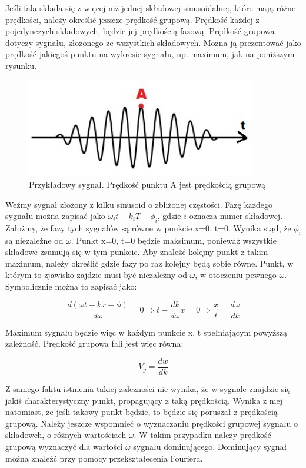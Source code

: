 Jeśli fala składa się z więcej niż jednej składowej sinusoidalnej, które mają różne prędkości, należy określić jeszcze prędkość grupową.  Prędkość każdej z pojedynczych składowych, będzie jej prędkością fazową. Prędkość grupowa dotyczy sygnału, złożonego ze wszystkich składowych. Można ją prezentować jako prędkość jakiegoś punktu na wykresie sygnału, np. maximum, jak na poniższym rysunku.

\begin{figure}[h]
\centering
\includegraphics[width=10cm]{Zdjecia/2/predkosc_grupowa_wierzcholek}
\caption{Przykładowy sygnał. Prędkość punktu A jest prędkością grupową}
\label{fig:przykladowy_sygnal}
\end{figure}

Weźmy sygnał złożony z kilku sinusoid o zbliżonej częstości. Fazę każdego sygnału można zapisać jako \( \omega_i t - k_i T + \phi_i \), gdzie \( i\) oznacza numer składowej. Założmy, że fazy tych sygnałów są równe w punkcie x=0, t=0. Wynika stąd, że \( \phi_i \) są niezależne od \( \omega \). Punkt x=0, t=0 będzie maksimum, ponieważ wszystkie składowe zsumują się w tym punkcie. Aby znaleźć kolejny punkt z takim maximum, należy określić gdzie fazy po raz kolejny będą sobie równe.  Punkt, w którym to zjawisko zajdzie musi być niezależny od \( \omega \), w otoczeniu pewnego \( \omega \). Symbolicznie można to zapisać jako:

\begin{equation}
\frac{d(\omega t - kx - \phi)}{d\omega}=0 \Rightarrow t-\frac{dk}{d\omega}x=0 \Rightarrow \frac{x}{t}=\frac{d\omega}{dk}
\end{equation}

Maximum sygnału będzie więc w każdym punkcie x, t spełniającym powyższą zależność. Prędkość grupowa fali jest więc równa:

\begin{equation}
V_g=\frac{dw}{dk}
\end{equation}

Z samego faktu istnienia takiej zależności nie wynika, że w sygnale znajdzie się jakiś charakterystyczny punkt, propagujący z taką prędkością. Wynika z niej natomiast, że jeśli takowy punkt będzie, to będzie się poruszał z prędkością grupową. Należy jeszcze wspomnieć o wyznaczaniu prędkości grupowej sygnału o składowch, o różnych wartościach \( \omega \). W takim przypadku należy prędkość grupową wyznaczyć dla wartości \(\omega\) sygnału dominującego. Dominujący sygnał można znaleźć przy pomocy przekształecenia Fouriera.

